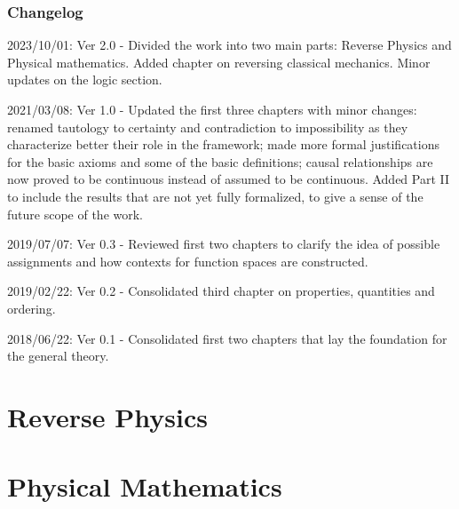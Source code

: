 \documentclass[11pt,letterpaper,fleqn]{memoir} %
\begin{document}
\section*{Changelog}

\begin{description}
	\item 2023/10/01: Ver 2.0 - Divided the work into two main parts: Reverse Physics and Physical mathematics. Added chapter on reversing classical mechanics. Minor updates on the logic section.
	\item 2021/03/08: Ver 1.0 - Updated the first three chapters with minor changes: renamed tautology to certainty and contradiction to impossibility as they characterize better their role in the framework; made more formal justifications for the basic axioms and some of the basic definitions; causal relationships are now proved to be continuous instead of assumed to be continuous. Added Part II to include the results that are not yet fully formalized, to give a sense of the future scope of the work.
	\item 2019/07/07: Ver 0.3 - Reviewed first two chapters to clarify the idea of possible assignments and how contexts for function spaces are constructed.
	\item 2019/02/22: Ver 0.2 - Consolidated third chapter on properties, quantities and ordering.
	\item 2018/06/22: Ver 0.1 - Consolidated first two chapters that lay the foundation for the general theory.
\end{description}


\cleardoublepage %

\tableofcontents* %

\cleardoublepage %


\mainmatter

\part{Reverse Physics}





\part{Physical Mathematics}
\end{document}
